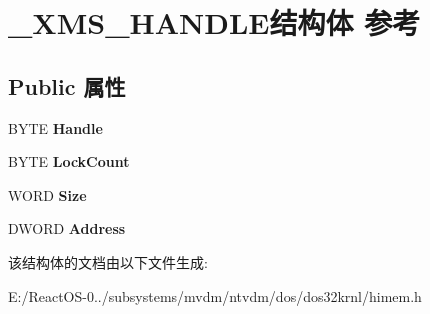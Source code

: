 \hypertarget{struct___x_m_s___h_a_n_d_l_e}{}\section{\+\_\+\+X\+M\+S\+\_\+\+H\+A\+N\+D\+L\+E结构体 参考}
\label{struct___x_m_s___h_a_n_d_l_e}
\subsection*{Public 属性}
\begin{DoxyCompactItemize}
\item 
\mbox{\label{struct___x_m_s___h_a_n_d_l_e_a15cf113ba27b4a3757355cd3797e7f88}} 
B\+Y\+TE {\bfseries Handle}
\item 
\mbox{\label{struct___x_m_s___h_a_n_d_l_e_ac6cecb96ff4535f047e454f74239f1ae}} 
B\+Y\+TE {\bfseries Lock\+Count}
\item 
\mbox{\label{struct___x_m_s___h_a_n_d_l_e_a242b5ccf0e200c121eb51dd874d3bc5c}} 
W\+O\+RD {\bfseries Size}
\item 
\mbox{\label{struct___x_m_s___h_a_n_d_l_e_a50326786dc6f8d4fe118361e840adf8a}} 
D\+W\+O\+RD {\bfseries Address}
\end{DoxyCompactItemize}


该结构体的文档由以下文件生成\+:\begin{DoxyCompactItemize}
\item 
E\+:/\+React\+O\+S-\/0../subsystems/mvdm/ntvdm/dos/dos32krnl/himem.\+h\end{DoxyCompactItemize}
